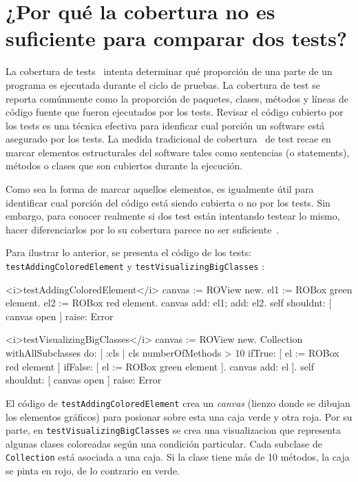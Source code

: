 \chapter{¿Por qué la cobertura no es suficiente para comparar dos tests?}

\par La cobertura de tests~\cite{Horwi02a} intenta determinar qué proporción de una parte de un programa es ejecutada durante el ciclo de pruebas. La cobertura de test se reporta comúnmente como la proporción de paquetes, clases, métodos y líneas de código fuente que fueron ejecutados por los tests. Revisar el código cubierto por los tests es una técnica efectiva para idenficar cual porción un software está asegurado por los tests. La medida tradicional de cobertura~\cite{Mock09a,Piwo93a} de test recae en marcar elementos estructurales del software tales como sentencias (o statements), métodos o clases que son cubiertos durante la ejecución.

\par Como sea la forma de marcar aquellos elementos, es igualmente útil para identificar cual porción del código está siendo cubierta o no por los tests. Sin embargo, para conocer realmente si dos test están intentando testear lo mismo,  hacer diferenciarlos por lo su cobertura parece no ser suficiente~\cite{van2001refactoring,greiler2012test}.    

\par Para ilustrar lo anterior, se presenta el código de los tests: {\tt testAddingColoredElement} y {\tt testVisualizingBigClasses} :

\begin{codeWithLineNumbers}
<i>testAddingColoredElement</i>
	canvas := ROView new.
	el1 := ROBox green element.
	el2 := ROBox red element.
	canvas add: el1; add: el2.
	self shouldnt: [ canvas open ] raise: Error

<i>testVisualizingBigClasses</i>
	canvas := ROView new.
	Collection withAllSubclasses do: [ :cls |
		cls numberOfMethods > 10
			ifTrue: [ el := ROBox red element ]
			ifFalse: [ el := ROBox green element ].
		canvas add: el ].
	self shouldnt: [ canvas open ] raise: Error
\end{codeWithLineNumbers} 

\par El código de {\tt testAddingColoredElement} crea un \emph{canvas} (lienzo donde se dibujan los elementos gráficos) para posionar sobre esta una caja verde y otra roja. Por su parte, en {\tt testVisualizingBigClasses} se crea una visualizacion que representa algunas clases coloreadas según una condición particular. Cada subclase de {\tt Collection} está asociada a una caja. Si la clase tiene más de 10 métodos, la caja se pinta en rojo, de lo contrario en verde. 

